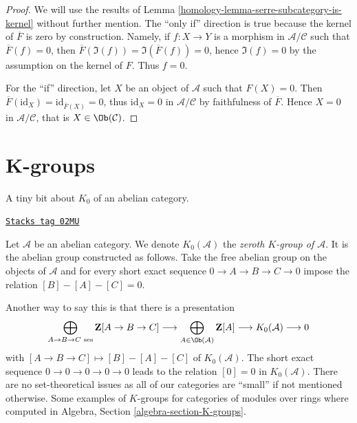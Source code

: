 \begin{proof}

We will use the results of Lemma \ref{homology-lemma-serre-subcategory-is-kernel}
without further mention.
The ``only if'' direction is true because the kernel of $\overline{F}$ is zero
by construction. Namely, if $f : X \to Y$ is a morphism in
$\mathcal{A}/\mathcal{C}$ such that $\overline{F}(f) = 0$, then
$\overline{F}(\Im(f)) = \Im(\overline{F}(f)) = 0$, hence $\Im(f) = 0$ by the
assumption on the kernel of $F$. Thus $f = 0$.

\medskip\noindent
For the ``if'' direction, let $X$ be an object of $\mathcal{A}$ such that $F(X)
= 0$. Then $\overline{F}(\text{id}_X) = \text{id}_{\overline{F}(X)} = 0$, thus
$\text{id}_X = 0$ in $\mathcal{A}/\mathcal{C}$ by faithfulness of
$\overline{F}$. Hence $X = 0$ in $\mathcal{A}/\mathcal{C}$, that is $X \in
\Ob(\mathcal{C})$.
\end{proof}

\section{K-groups}
\label{homology-section-K-groups}
A tiny bit about $K_0$ of an abelian category.

\begin{definition}[K zero]
\label{homology-definition-K-zero}
\href{https://stacks.math.columbia.edu/tag/02MU}{\texttt{Stacks tag 02MU}}

Let $\mathcal{A}$ be an abelian category.
We denote $K_0(\mathcal{A})$ the
{\it zeroth $K$-group of $\mathcal{A}$}.
It is the abelian group constructed as follows.
Take the free abelian group
on the objects of $\mathcal{A}$
and for every short exact sequence
$0 \to A \to B \to C \to 0$
impose the relation $[B] - [A] - [C] = 0$.
\end{definition}

Another way to say this is that there is a presentation
$$
\bigoplus_{A \to B \to C\text{ ses}}
\mathbf{Z}[A \to B \to C]
\longrightarrow
\bigoplus_{A \in \Ob(\mathcal{A})}
\mathbf{Z}[A]
\longrightarrow
K_0(\mathcal{A})
\longrightarrow
0
$$
with $[A \to B \to C] \mapsto [B] - [A] - [C]$ of $K_0(\mathcal{A})$.
The short exact sequence $0 \to 0 \to 0 \to 0 \to 0$
leads to the relation $[0] = 0$ in $K_0(\mathcal{A})$.
There are no set-theoretical issues as all of our categories
are ``small'' if not mentioned otherwise.
Some examples of $K$-groups for categories of modules
over rings where computed in
Algebra, Section \ref{algebra-section-K-groups}.

